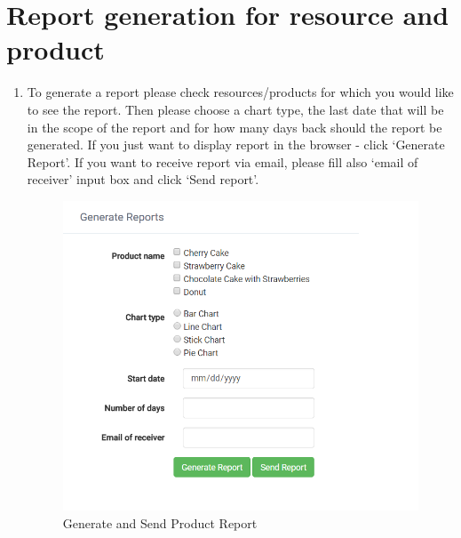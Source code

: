 \documentclass[a4paper,11pt,twoside]{report}
\theoremstyle{definition}
\begin{document}
\section{Report generation for resource and product}
\begin{enumerate}
\item To generate a report please check resources/products for which you would like to see the report. Then please choose a chart type, the last date that will be in the scope of the report and for how many days back should the report be generated. If you just want to display report in the browser - click ‘Generate Report’. If you want to receive report via email, please fill also ‘email of receiver’ input box and click ‘Send report’.

\begin{figure}[h!]
\begin{center}
\includegraphics[scale = 1]{AS/report/1}
\end{center}
\caption{Generate and Send Product Report}
\end{figure}
\thispagestyle{empty}


\end{enumerate}
\end{document}
